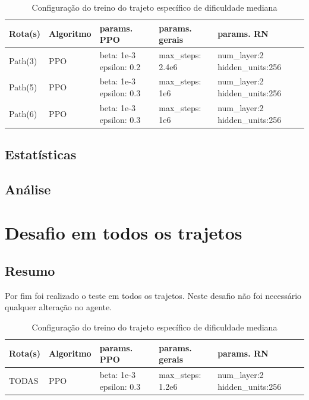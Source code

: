 \begin{table}[htpb]
    \centering
    \caption{Configuração do treino do trajeto específico de dificuldade mediana}
    \begin{tabular}{|l|p{2cm}|p{3cm}|p{3cm}|p{3.5cm}|}
         \hline
         \small{Rota(s)} & \small{Algoritmo} &          \small{params. PPO}         & \small{params. gerais} &          \small{params. RN}              \\ \hline
            Path(3)      &      PPO          &     beta: 1e-3 \newline epsilon: 0.2 &    max\_steps: 2.4e6  &    num\_layer:2 \newline hidden\_units:256  \\ \hline
            Path(5)      &      PPO          &     beta: 1e-3 \newline epsilon: 0.3 &    max\_steps: 1e6  &    num\_layer:2 \newline hidden\_units:256  \\ \hline
            Path(6)      &      PPO          &     beta: 1e-3 \newline epsilon: 0.3 &    max\_steps: 1e6  &    num\_layer:2 \newline hidden\_units:256  \\ \hline
    \end{tabular}
 \end{table}

\subsection*{Estatísticas}


\subsection*{Análise}

\section{Desafio em todos os trajetos}
\subsection*{Resumo}
Por fim foi realizado o teste em todos os trajetos. Neste desafio não foi necessário qualquer alteração no agente.
\begin{table}[htpb]
    \centering
    \caption{Configuração do treino do trajeto específico de dificuldade mediana}
    \begin{tabular}{|l|p{2cm}|p{3cm}|p{3cm}|p{3.5cm}|}
         \hline
         \small{Rota(s)} & \small{Algoritmo} &          \small{params. PPO}             & \small{params. gerais} &          \small{params. RN}                  \\ \hline
            TODAS        &      PPO          &     beta: 1e-3 \newline epsilon: 0.3     &    max\_steps: 1.2e6   &    num\_layer:2 \newline hidden\_units:256   \\ \hline
    \end{tabular}
\end{table}
